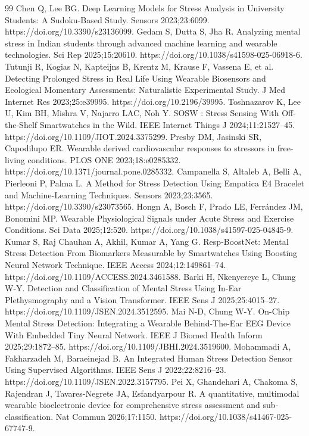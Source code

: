 \begin{thebibliography}{99}
 Chen Q, Lee BG. Deep Learning Models for Stress Analysis in University Students: A Sudoku-Based Study. Sensors 2023;23:6099. https://doi.org/10.3390/s23136099.
 Gedam S, Dutta S, Jha R. Analyzing mental stress in Indian students through advanced machine learning and wearable technologies. Sci Rep 2025;15:20610. https://doi.org/10.1038/s41598-025-06918-6.
 Tutunji R, Kogias N, Kapteijns B, Krentz M, Krause F, Vassena E, et al. Detecting Prolonged Stress in Real Life Using Wearable Biosensors and Ecological Momentary Assessments: Naturalistic Experimental Study. J Med Internet Res 2023;25:e39995. https://doi.org/10.2196/39995.
 Toshnazarov K, Lee U, Kim BH, Mishra V, Najarro LAC, Noh Y. SOSW : Stress Sensing With Off-the-Shelf Smartwatches in the Wild. IEEE Internet Things J 2024;11:21527--45. https://doi.org/10.1109/JIOT.2024.3375299.
 Presby DM, Jasinski SR, Capodilupo ER. Wearable derived cardiovascular responses to stressors in free-living conditions. PLOS ONE 2023;18:e0285332. https://doi.org/10.1371/journal.pone.0285332.
 Campanella S, Altaleb A, Belli A, Pierleoni P, Palma L. A Method for Stress Detection Using Empatica E4 Bracelet and Machine-Learning Techniques. Sensors 2023;23:3565. https://doi.org/10.3390/s23073565.
 Hongn A, Bosch F, Prado LE, Ferrández JM, Bonomini MP. Wearable Physiological Signals under Acute Stress and Exercise Conditions. Sci Data 2025;12:520. https://doi.org/10.1038/s41597-025-04845-9.
 Kumar S, Raj Chauhan A, Akhil, Kumar A, Yang G. Resp-BoostNet: Mental Stress Detection From Biomarkers Measurable by Smartwatches Using Boosting Neural Network Technique. IEEE Access 2024;12:149861--74. https://doi.org/10.1109/ACCESS.2024.3461588.
 Barki H, Nkenyereye L, Chung W-Y. Detection and Classification of Mental Stress Using In-Ear Plethysmography and a Vision Transformer. IEEE Sens J 2025;25:4015--27. https://doi.org/10.1109/JSEN.2024.3512595.
 Mai N-D, Chung W-Y. On-Chip Mental Stress Detection: Integrating a Wearable Behind-The-Ear EEG Device With Embedded Tiny Neural Network. IEEE J Biomed Health Inform 2025;29:1872--85. https://doi.org/10.1109/JBHI.2024.3519600.
 Mohammadi A, Fakharzadeh M, Baraeinejad B. An Integrated Human Stress Detection Sensor Using Supervised Algorithms. IEEE Sens J 2022;22:8216--23. https://doi.org/10.1109/JSEN.2022.3157795.
 Pei X, Ghandehari A, Chakoma S, Rajendran J, Tavares-Negrete JA, Esfandyarpour R. A quantitative, multimodal wearable bioelectronic device for comprehensive stress assessment and sub-classification. Nat Commun 2026;17:1150. https://doi.org/10.1038/s41467-025-67747-9.

\end{thebibliography}
